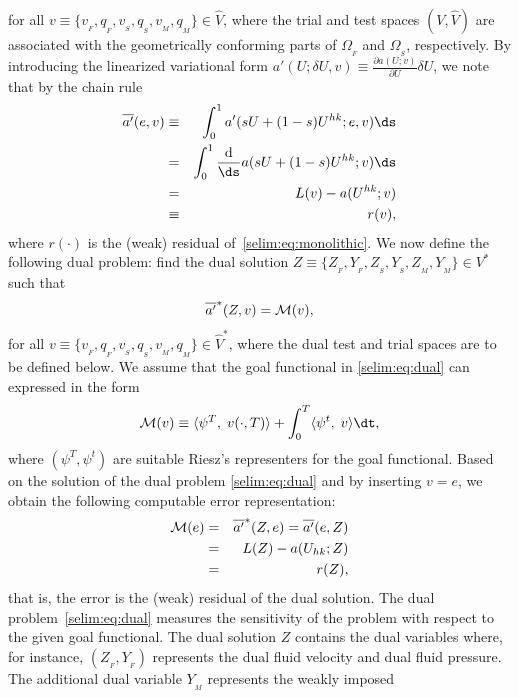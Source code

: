 for all $v\equiv\{ v_{_{F}}, q_{_{F}}, v_{_{S}}, q_{_{S}}, v_{_{M}}, q_{_{M}}
\}\in\hat{V}$, where the trial and test spaces $(V,\hat{V})$ are
associated with the geometrically conforming parts of $\Omega_{_{F}}$
and $\Omega_{_{S}}$, respectively. By introducing the linearized
variational form $a'(U; \delta U,v ) \equiv \frac{\partial
  a(U;v)}{\partial U}\delta U$, we note that by the chain rule
\begin{eqnarray}
\overline{a'}(e, v)  &\equiv& \int_0^1 a'(sU + (1-s)U^{hk}; e,
v) \ds \\ &=& \int_0^1 \frac{\textrm{d}}{\ds} a (sU + (1-s)U^{hk}; v)
\ds \\ &=& L(v) - a(U^{hk};v) \\ &\equiv&  r(v),
\end{eqnarray}
where $r(\cdot)$ is the (weak) residual of~\eqref{selim:eq:monolithic}.
We now define the following dual problem: find the dual solution
$Z\equiv \{ Z_{_{F}}, Y_{_{F}}, Z_{_{S}}, Y_{_{S}}, Z_{_{M}},
Y_{_{M}}\}\in V^*$ such that
\begin{equation}
  \label{selim:eq:dual}
  \overline{a'}^{*}(Z, v) = \mathcal{M}(v),
\end{equation}
for all $v\equiv \{ v_{_{F}}, q_{_{F}}, v_{_{S}}, q_{_{S}}, v_{_{M}}, q_{_{M}}
\}\in\hat{V}^*$, where the dual test and trial spaces are to be
defined below.
We assume that the goal functional in \eqref{selim:eq:dual} can
expressed in the form
\begin{equation}
\M(v)  \equiv \langle \psi^T,\;  v(\cdot, T) \rangle +
\int_0^T \langle \psi^t,\; v \rangle \dt,
\end{equation}
where $(\psi^T, \psi^t)$ are suitable Riesz's representers for the
goal functional. Based on the solution of the dual
problem \eqref{selim:eq:dual} and by inserting $v=e$,
we obtain the following computable error representation:
\begin{eqnarray}
\label{selim:eq:representation}
\nonumber
\mathcal{M}(e) &=& \overline{a'}^{*}(Z ,e) = \overline{a'}(e, Z)\\ &=& L(Z) - a(
U_{hk}; Z)\\
\nonumber
&=& r(Z),
\end{eqnarray}
that is, the error is the (weak) residual of the dual solution.  The
dual problem~\eqref{selim:eq:dual} measures the sensitivity of the
problem with respect to the given goal functional. The dual solution
$Z$ contains the dual variables where, for instance, $(Z_{_{F}},
Y_{_{F}})$ represents the dual fluid velocity and dual fluid pressure.
The additional dual variable $Y_{_{M}}$ represents the weakly imposed
